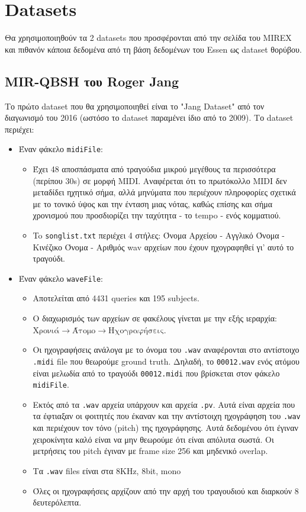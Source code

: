 \section{Datasets}

Θα χρησιμοποιηθούν τα 2 datasets που προσφέρονται από την σελίδα του MIREX \cite{mirex}
και πιθανόν κάποια δεδομένα από τη βάση δεδομένων του Essen ως dataset θορύβου.

\subsection{MIR-QBSH του Roger Jang}
Το πρώτο dataset που θα χρησιμοποιηθεί είναι το "Jang Dataset" \cite{jang-dataset} από τον διαγωνισμό του 2016 (ωστόσο το dataset παραμένει ίδιο από το 2009). Το dataset περιέχει:
\begin{itemize}
\item Έναν φάκελο \texttt{midiFile}:
\begin{itemize}
\item Έχει 48 αποσπάσματα από τραγούδια μικρού μεγέθους τα περισσότερα (περίπου 30s) σε μορφή MIDI\cite{midi1996complete}.
Αναφέρεται ότι το πρωτόκολλο MIDI δεν μεταδίδει ηχητικό σήμα, αλλά μηνύματα που περιέχουν πληροφορίες σχετικά με το τονικό ύψος και την ένταση μιας νότας, καθώς επίσης και σήμα χρονισμού που προσδιορίζει την ταχύτητα - το tempo - ενός κομματιού.
\item To \texttt{songlist.txt} περιέχει 4 στήλες: Όνομα Αρχείου - Αγγλικό Όνομα - Κινέζικο Όνομα - Αριθμός wav αρχείων που έχουν ηχογραφηθεί γι' αυτό το τραγούδι.
\end{itemize}

\item Έναν φάκελο \texttt{waveFile}:
\begin{itemize}
\item Αποτελείται από 4431 queries και 195 subjects.
\item Ο διαχωρισμός των αρχείων σε φακέλους γίνεται με την εξής ιεραρχία:
\(\text{Χρονιά} \rightarrow \text{Άτομο} \rightarrow \text{Ηχογραφήσεις}\).
\item Οι ηχογραφήσεις ανάλογα με το όνομα του \texttt{.wav} αναφέρονται στο αντίστοιχο \texttt{.midi} file που θεωρούμε ground truth.
Δηλαδή, το \texttt{00012.wav} ενός ατόμου είναι μελωδία από το τραγούδι \texttt{00012.midi} που βρίσκεται στον φάκελο \texttt{midiFile}.
\item Εκτός από τα \texttt{.wav} αρχεία υπάρχουν και αρχεία \texttt{.pv}.\label{item:pitch-vector}
Αυτά είναι αρχεία που τα έφτιαξαν οι φοιτητές που έκαναν και την αντίστοιχη
ηχογράφηση του \texttt{.wav} και περιέχουν τον τόνο (pitch) της ηχογράφησης. Αυτά δεδομένου ότι
έγιναν χειροκίνητα καλό είναι να μην θεωρούμε ότι είναι απόλυτα σωστά. Οι μετρήσεις του
pitch έγιναν με frame size 256 και μηδενικό overlap.
\item Τα \texttt{.wav} files είναι στα 8KHz, 8bit, mono
\item Όλες οι ηχογραφήσεις αρχίζουν από την αρχή του τραγουδιού και διαρκούν 8 δευτερόλεπτα.
\end{itemize}
\end{itemize}

